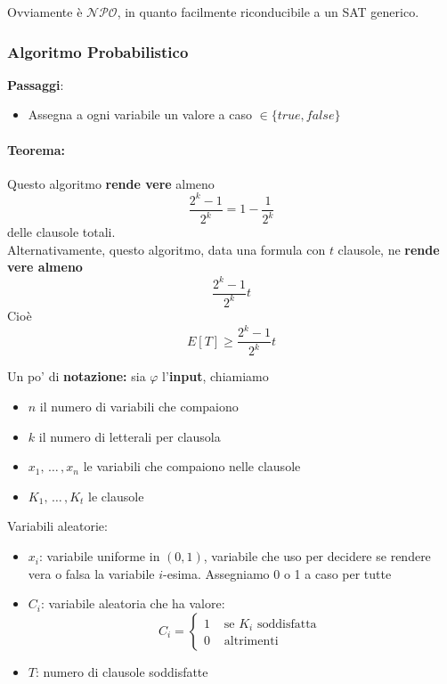 Ovviamente è $\mathcal{NPO}$, in quanto facilmente riconducibile a un SAT generico.\\


\subsubsection{Algoritmo Probabilistico}

\textbf{Passaggi}: 
\begin{itemize}
	\item Assegna a ogni variabile un valore a caso $\in \{true, false\}$
\end{itemize}

\paragraph{Teorema:} Questo algoritmo \textbf{rende vere} almeno 
$$ \frac{2^k-1}{2^k} = 1 - \frac{1}{2^k} $$
delle clausole totali.\\

Alternativamente, questo algoritmo, data una formula con $t$ clausole, ne \textbf{rende vere almeno}
$$ \frac{2^k-1}{2^k} t $$
Cioè 
$$ E[T] \geq  \frac{2^k-1}{2^k} t  $$

Un po' di \textbf{notazione:} sia $\varphi$ l'\textbf{input}, chiamiamo 
\begin{itemize}
	\item $n$ il numero di variabili che compaiono
	\item $k$ il numero di letterali per clausola 
	\item $x_1, \, \dots \, , x_n$ le variabili che compaiono nelle clausole
	\item $K_1, \, \dots \, , K_t$ le clausole
\end{itemize}

Variabili aleatorie: 
\begin{itemize}
	\item $x_i$: variabile uniforme in $(0,1)$, variabile che uso per decidere se rendere vera o falsa la variabile $i$-esima. Assegniamo 0 o 1 a caso per tutte
	\item $C_i$: variabile aleatoria che ha valore:
	$$ C_i = \begin{cases}
		1 & \text{ se } K_i \text{ soddisfatta } \\
		0 &  \text{ altrimenti }
	\end{cases}
	$$
	\item $T$: numero di clausole soddisfatte
\end{itemize}

